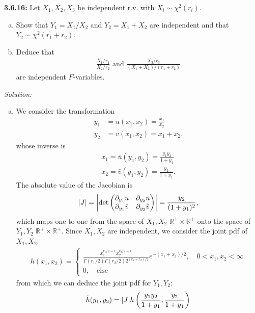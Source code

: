 \documentclass{book}
\theoremstyle{definition}
\newcommand{\p}{\partial}
\newcommand{\R}{\mathbb{R}}
\newcommand{\nn}{\nonumber}
\newcommand{\f}[2]{\frac{#1}{#2}}
\newcommand{\lp}{\left(}
\newcommand{\rp}{\right)}
\begin{document}
\newpage
\noindent\textbf{3.6.16:} Let $X_1, X_2, X_3$ be independent r.v. with $X_i \sim \chi^2(r_i)$. 
\begin{enumerate}[(a)]
	\item Show that $Y_1 = X_1/X_2$ and $Y_2 = X_1 + X_2$ are independent and that $Y_2 \sim \chi^2(r_1 + r_2)$. 
	
	\item Deduce that 
	\begin{align}
	\f{X_1/r_1}{X_2/r_2} \text{ and } \f{X_3/r_3}{(X_1 + X_2)/(r_1 + r_2)}
	\end{align}
	are independent $F$-variables. 
\end{enumerate}

\noindent \textit{Solution:}  

\begin{enumerate}[(a)]
	\item We consider the transformation
	\begin{align}
	y_1 &= u(x_1,x_2) = \f{x_1}{x_2}\\
	y_2 &= v(x_1,x_2) = x_1 + x_2.
	\end{align}
	whose inverse is 
	\begin{align}
	x_1 = \bar{u}(y_1, y_2) = \f{y_1y_2}{1+y_1}\nn\\
	x_2 = \bar{v}(y_1, y_2) = \f{y_2}{1+y_1}.
	\end{align}
	The absolute value of the Jacobian is 
	\begin{align}
	\abs{J} = \abs{\det\begin{pmatrix}
		\p_{y_1}\bar{u} & \p_{y_2}\bar{u}\\
		\p_{y_1}\bar{v} & \p_{y_2}\bar{v}\\
		\end{pmatrix}} = \f{y_2}{(1+y_1)^2},
	\end{align}
	which maps one-to-one from the space of $X_1,X_2$ $\R^+\times \R^+$ onto the space of $Y_1, Y_2$ $\R^+\times \R^+$. Since $X_1, X_2$ are independent, we consider the joint pdf of $X_1, X_2$:
	\begin{align}
	h(x_1, x_2) = \begin{cases}
	\f{x_1^{r_1/2-1}x_2^{r_2/2-1}}{\Gamma(r_1/2)\Gamma(r_2/2)2^{(r_1+r_2)/2}}e^{-(x_1+x_2)/2}, \quad 0 < x_1,x_2 < \infty\\
	0, \quad \text{else}
	\end{cases}
	\end{align}
	from which we can deduce the joint pdf for $Y_1, Y_2$:
	\begin{align}
	\tilde{h}(y_1,y_2) &= \abs{J}h\lp \f{y_1y_2}{1+y_1}, \f{y_2}{1+y_1} \rp\nn\\

\end{align}
\end{enumerate}
\end{document}
